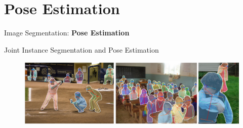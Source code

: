 \section{Pose Estimation}
\begin{frame}{}
    \LARGE Image Segmentation: \textbf{Pose Estimation}
\end{frame}

\begin{frame}{Joint Instance Segmentation and Pose Estimation}
\begin{figure}
\centering
\includegraphics[width=1.0\textwidth,height=1.0\textheight,keepaspectratio]{images/segmentation/ins_15.png}
\end{figure}
    

\end{frame}
